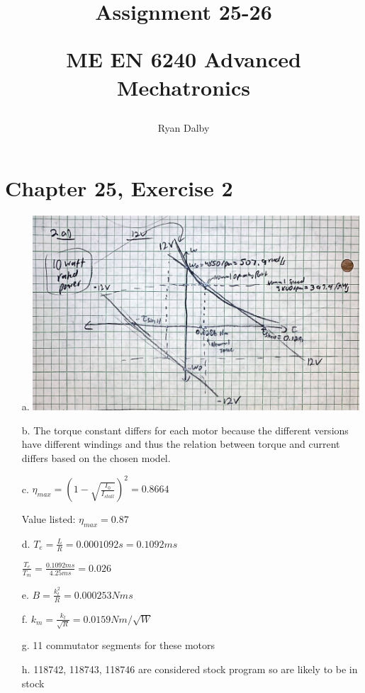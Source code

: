 \documentclass[12pt]{article}
\title{
    Assignment 25-26 

    \large{
        ME EN 6240 Advanced Mechatronics
    }  
}
\author{
        Ryan Dalby
}
\date{\displaydate{date}}
\begin{document}
\maketitle

\section*{Chapter 25, Exercise 2}
\begin{itemize}
    \item[a.] 
    \includegraphics[width=4.8in]{25_2a.png}

    \item[b.] 
    The torque constant differs for each motor because the different versions have different windings and thus the relation between torque and current differs based on the chosen model.

    \item[c.] 
    $\eta_{max} = (1 - \sqrt{\frac{I_0}{I_{stall}}})^2 = 0.8664$

    Value listed:  $\eta_{max} = 0.87$

    \item[d.] 
    $T_e = \frac{L}{R} = 0.0001092 s = 0.1092 ms$

    $\frac{T_e}{T_m} = \frac{0.1092ms}{4.25ms} = 0.026$

    \item[e.] 
    $B = \frac{k_t^2}{R} = 0.000253 Nms$

    \item[f.] 
    $k_m = \frac{k_t}{\sqrt{R}} = 0.0159 Nm/\sqrt{W}$

    \item[g.] 
    11 commutator segments for these motors

    \item[h.] 
    118742, 118743, 118746 are considered stock program so are likely to be in stock

\end{itemize}
\end{document}
